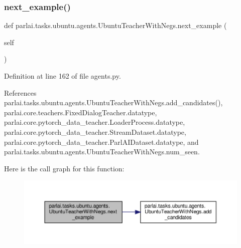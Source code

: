 \subsubsection{\texorpdfstring{next\+\_\+example()}{next\_example()}}
{\footnotesize\ttfamily def parlai.\+tasks.\+ubuntu.\+agents.\+Ubuntu\+Teacher\+With\+Negs.\+next\+\_\+example (\begin{DoxyParamCaption}\item[{}]{self }\end{DoxyParamCaption})}



Definition at line 162 of file agents.\+py.



References parlai.\+tasks.\+ubuntu.\+agents.\+Ubuntu\+Teacher\+With\+Negs.\+add\+\_\+candidates(), parlai.\+core.\+teachers.\+Fixed\+Dialog\+Teacher.\+datatype, parlai.\+core.\+pytorch\+\_\+data\+\_\+teacher.\+Loader\+Process.\+datatype, parlai.\+core.\+pytorch\+\_\+data\+\_\+teacher.\+Stream\+Dataset.\+datatype, parlai.\+core.\+pytorch\+\_\+data\+\_\+teacher.\+Parl\+A\+I\+Dataset.\+datatype, and parlai.\+tasks.\+ubuntu.\+agents.\+Ubuntu\+Teacher\+With\+Negs.\+num\+\_\+seen.

Here is the call graph for this function\+:
\nopagebreak
\begin{figure}[H]
\begin{center}
\leavevmode
\includegraphics[width=350pt]{classparlai_1_1tasks_1_1ubuntu_1_1agents_1_1UbuntuTeacherWithNegs_aef77d69155c1215eb64ec5c1ba895bdf_cgraph}
\end{center}
\end{figure}
\mbox{\label{classparlai_1_1tasks_1_1ubuntu_1_1agents_1_1UbuntuTeacherWithNegs_aacac8ac1f8b79287b943b85ed21b081b}} 
